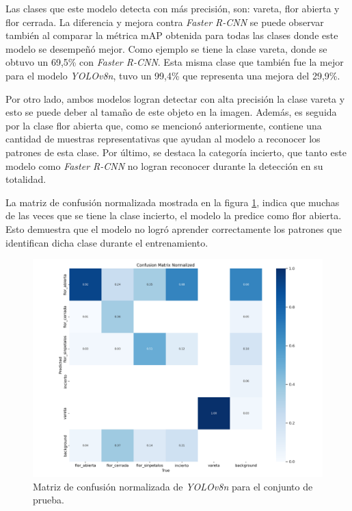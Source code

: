 Las clases que este modelo detecta con más precisión, son: vareta, flor abierta y flor cerrada. La diferencia y mejora contra \textit{Faster R-CNN} se puede observar también al comparar la métrica mAP obtenida para todas las clases donde este modelo se desempeñó mejor. Como ejemplo se tiene la clase vareta, donde se obtuvo un 69,5\% con \textit{Faster R-CNN}. Esta misma clase que también fue la mejor para el modelo \textit{YOLOv8n}, tuvo un 99,4\% que representa una mejora del 29,9\%.

Por otro lado, ambos modelos  logran detectar con alta precisión la clase vareta y esto se puede deber al tamaño de este objeto en la imagen. Además, es seguida por la clase flor abierta que, como se mencionó anteriormente, contiene una cantidad de muestras representativas que ayudan al modelo a reconocer los patrones de esta clase. Por último, se destaca la categoría incierto, que tanto este modelo como \textit{Faster R-CNN} no logran reconocer durante la detección en su totalidad.

La matriz de confusión normalizada mostrada en la figura \ref{fig:cfmatriznorm}, indica que muchas de las veces que se tiene la clase incierto, el modelo la predice como flor abierta. Esto demuestra que el modelo no logró aprender correctamente los patrones que identifican dicha clase durante el entrenamiento.

\begin{figure}[ht]
	\centering
	\includegraphics[scale=0.49]{./Figures/CFMatrixnorm.png}
	\caption{Matriz de confusión normalizada de \textit{YOLOv8n} para el conjunto de prueba.}
	\label{fig:cfmatriznorm}
\end{figure}
\newpage
